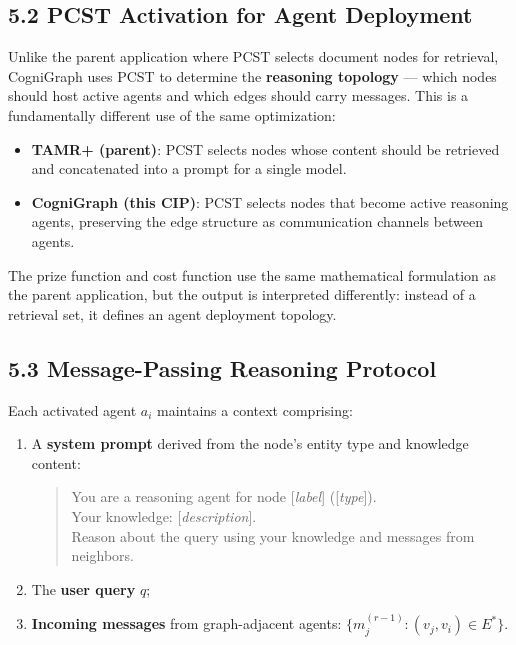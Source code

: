 \documentclass[a4paper,12pt]{article}
\begin{document}
\subsection*{5.2 PCST Activation for Agent Deployment}

\noindent Unlike the parent application where PCST selects document nodes for retrieval, CogniGraph uses PCST to determine the \textbf{reasoning topology} --- which nodes should host active agents and which edges should carry messages. This is a fundamentally different use of the same optimization:

\begin{itemize}[nosep,leftmargin=2em]
\item \textbf{TAMR+ (parent)}: PCST selects nodes whose content should be retrieved and concatenated into a prompt for a single model.
\item \textbf{CogniGraph (this CIP)}: PCST selects nodes that become active reasoning agents, preserving the edge structure as communication channels between agents.
\end{itemize}

\noindent The prize function and cost function use the same mathematical formulation as the parent application, but the output is interpreted differently: instead of a retrieval set, it defines an agent deployment topology.

\subsection*{5.3 Message-Passing Reasoning Protocol}

\noindent Each activated agent $a_i$ maintains a context comprising:

\begin{enumerate}[nosep,leftmargin=2em]
\item A \textbf{system prompt} derived from the node's entity type and knowledge content:
\begin{quote}
\small\ttfamily
You are a reasoning agent for node [\textit{label}] ([\textit{type}]). \\
Your knowledge: [\textit{description}]. \\
Reason about the query using your knowledge and messages from neighbors.
\end{quote}

\item The \textbf{user query} $q$;
\item \textbf{Incoming messages} from graph-adjacent agents: $\{m_j^{(r-1)} : (v_j, v_i) \in E^*\}$.
\end{enumerate}
\end{document}
